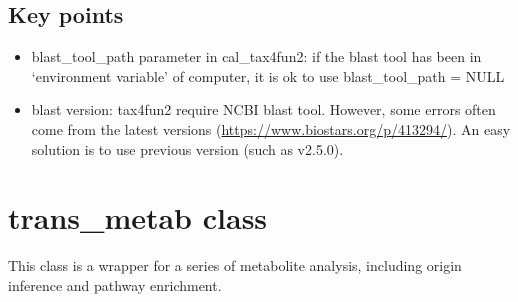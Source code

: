 \documentclass[
]{book}
\providecommand{\tightlist}{%
  \setlength{\itemsep}{0pt}\setlength{\parskip}{0pt}}
\begin{document}
\subsection{Key points}\label{key-points-11}

\begin{itemize}
\tightlist
\item
  blast\_tool\_path parameter in cal\_tax4fun2: if the blast tool has been in `environment variable' of computer, it is ok to use blast\_tool\_path = NULL
\item
  blast version: tax4fun2 require NCBI blast tool. However, some errors often come from the latest versions (\url{https://www.biostars.org/p/413294/}). An easy solution is to use previous version (such as v2.5.0).
\end{itemize}

\section{trans\_metab class}\label{trans_metab-class}

This class is a wrapper for a series of metabolite analysis, including origin inference \citep{Wang_TidyMass2_2026} and pathway enrichment.
\end{document}
